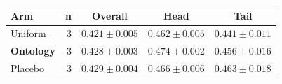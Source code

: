 \begin{tabular}{@{}lrccc@{}}
\toprule
\textbf{Arm} & \textbf{n} & \textbf{Overall} & \textbf{Head} & \textbf{Tail} \\
\midrule
Uniform & 3 & $0.421 \pm 0.005$ & $0.462 \pm 0.005$ & $0.441 \pm 0.011$ \\
\textbf{Ontology} & 3 & $0.428 \pm 0.003$ & $0.474 \pm 0.002$ & $0.456 \pm 0.016$ \\
Placebo & 3 & $0.429 \pm 0.004$ & $0.466 \pm 0.006$ & $0.463 \pm 0.018$ \\
\bottomrule
\end{tabular}
